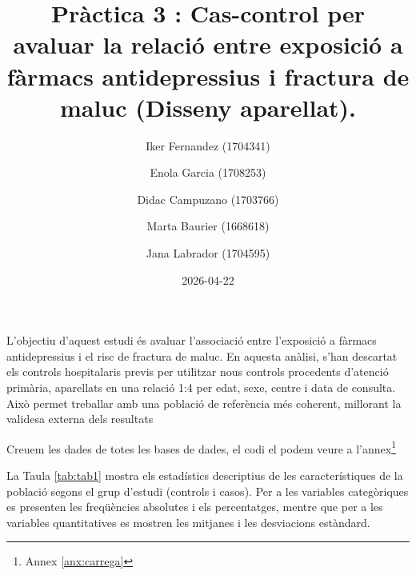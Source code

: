 \documentclass[
]{article}
\title{Pràctica 3 : Cas-control per avaluar la relació entre exposició a
fàrmacs antidepressius i fractura de maluc (Disseny aparellat).}
\author{Iker Fernandez (1704341) \and Enola Garcia (1708253) \and Didac
Campuzano (1703766) \and Marta Baurier (1668618) \and Jana Labrador
(1704595)}
\date{2026-04-22}
\begin{document}
\maketitle

L'objectiu d'aquest estudi és avaluar l'associació entre l'exposició a
fàrmacs antidepressius i el risc de fractura de maluc. En aquesta
anàlisi, s'han descartat els controls hospitalaris previs per utilitzar
nous controls procedents d'atenció primària, aparellats en una relació
1:4 per edat, sexe, centre i data de consulta. Això permet treballar amb
una població de referència més coherent, millorant la validesa externa
dels resultats

Creuem les dades de totes les bases de dades, el codi el podem veure a
l'annex\footnote{Annex \ref{anx:carrega}}

La Taula \ref{tab:tab1} mostra els estadístics descriptius de les
característiques de la població segons el grup d'estudi (controls i
casos). Per a les variables categòriques es presenten les freqüències
absolutes i els percentatges, mentre que per a les variables
quantitatives es mostren les mitjanes i les desviacions estàndard.
\end{document}
